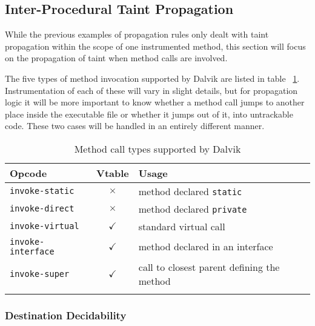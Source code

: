 \documentclass[12pt,twoside,notitlepage]{report}
\newcommand{\tick}{$\checkmark$}
\newcommand{\cross}{$\times$}
\begin{document}


\subsection{Inter-Procedural Taint Propagation}
\label{section:TaintPropagation_MethodCalls}

While the previous examples of propagation rules only dealt with taint propagation within the scope of one instrumented method, this section will focus on the propagation of taint when method calls are involved. 

The five types of method invocation supported by Dalvik are listed in table ~\ref{table:TaintPropagation_MethodCallTypes}. Instrumentation of each of these will vary in slight details, but for propagation logic it will be more important to know whether a method call jumps to another place inside the executable file or whether it jumps out of it, into untrackable code. These two cases will be handled in an entirely different manner. 

\begin{table}
	\begin{center}
	\begin{tabular}{|l|c|l|}
		\firsthline
		\textbf{Opcode}         & \textbf{Vtable} & \textbf{Usage} \\
		\hline
		\verb$invoke-static$    & \cross          & method declared \verb$static$ \\
		\verb$invoke-direct$    & \cross          & method declared \verb$private$ \\
		\hline
		\verb$invoke-virtual$   & \tick           & standard virtual call \\
		\verb$invoke-interface$ & \tick           & method declared in an interface \\
		\verb$invoke-super$     & \tick           & call to closest parent defining the method \\
		\lasthline
	\end{tabular}
	\end{center}
	\caption{Method call types supported by Dalvik}
	\label{table:TaintPropagation_MethodCallTypes}
\end{table}


\subsubsection{Destination Decidability}
\end{document}
